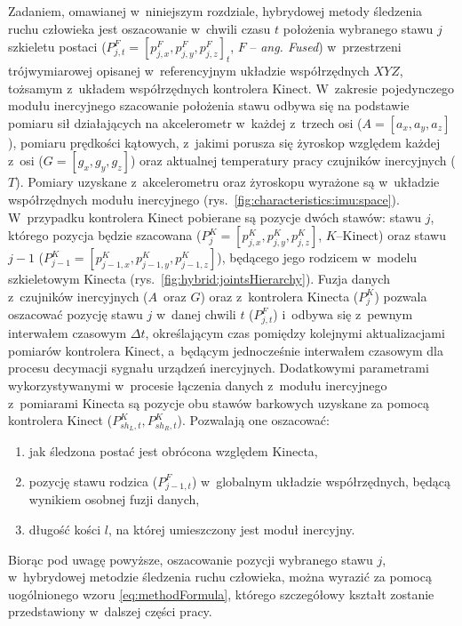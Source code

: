 		
Zadaniem, omawianej w~niniejszym rozdziale, hybrydowej metody śledzenia ruchu człowieka jest oszacowanie w~chwili czasu $t$ położenia wybranego stawu $j$ szkieletu postaci ($P^F_{j,t} = [p^F_{j,x}, p^F_{j,y}, p^F_{j,z}]_t$, $F$ -- \emph{ang. Fused})  w~przestrzeni trójwymiarowej opisanej w~referencyjnym układzie współrzędnych $X Y Z$, tożsamym z~układem współrzędnych kontrolera Kinect. W~zakresie pojedynczego modułu inercyjnego szacowanie położenia stawu odbywa się na podstawie pomiaru sił działających na akcelerometr w~każdej z~trzech osi ($A = [a_x, a_y, a_z]$), pomiaru prędkości kątowych, z~jakimi porusza się żyroskop względem każdej z~osi ($G = [g_x, g_y, g_z]$) oraz aktualnej temperatury pracy czujników inercyjnych ($T$). Pomiary uzyskane z~akcelerometru oraz żyroskopu wyrażone są w~układzie współrzędnych modułu inercyjnego (rys.~\ref{fig:characteristics:imu:space}). W~przypadku kontrolera Kinect pobierane są pozycje dwóch stawów: stawu $j$, którego pozycja będzie szacowana ($P^K_{j} = [p^K_{j,x}, p^K_{j,y}, p^K_{j,z}]$, $K$--Kinect) oraz stawu $j-1$ ($P^K_{j-1} = [p^K_{j-1,x},p^K_{j-1,y}, p^K_{j-1,z}]$), będącego jego rodzicem w~modelu szkieletowym Kinecta (rys.~\ref{fig:hybrid:jointsHierarchy}). Fuzja danych z~czujników inercyjnych ($A$~oraz $G$) oraz z~kontrolera Kinecta ($P^K_j$) pozwala oszacować pozycję stawu $j$ w~danej chwili $t$ ($P^F_{j,t}$) i~odbywa się z~pewnym interwałem czasowym $\Delta t$, określającym czas pomiędzy kolejnymi aktualizacjami pomiarów kontrolera Kinect, a~będącym jednocześnie interwałem czasowym dla procesu decymacji sygnału urządzeń inercyjnych. Dodatkowymi parametrami wykorzystywanymi w~procesie łączenia danych z~modułu inercyjnego z~pomiarami Kinecta są pozycje obu stawów barkowych uzyskane za pomocą kontrolera Kinect ($P^K_{sh_L,t}, P^K_{sh_R,t}$). Pozwalają one oszacować:

\begin{enumerate}
	\item jak śledzona postać jest obrócona względem Kinecta,
	\item pozycję stawu rodzica ($P^F_{j-1,t}$) w~globalnym układzie współrzędnych, będącą wynikiem osobnej fuzji danych,
	\item długość kości $l$, na której umieszczony jest moduł inercyjny.
\end{enumerate}

Biorąc pod uwagę powyższe, oszacowanie pozycji wybranego stawu $j$, w~hybrydowej metodzie śledzenia ruchu człowieka, można wyrazić za pomocą uogólnionego wzoru \ref{eq:methodFormula}, którego szczegółowy kształt zostanie przedstawiony w~dalszej części pracy.
		
